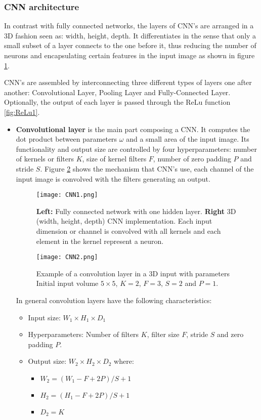 \subsubsection{CNN architecture}
In contrast with fully connected networks, the layers of CNN's are arranged in a 3D fashion seen as: width, height, depth. It differentiates in the sense that only a small subset of a layer connects to the one before it, thus reducing the number of neurons and encapsulating certain features in the input image as shown in  figure \ref{fig:CNNim1}. \

CNN's are assembled by interconnecting three different types of layers one after another: Convolutional Layer, Pooling Layer and Fully-Connected Layer. Optionally, the output of each layer is passed through the ReLu function \ref{fig:ReLu1}. 
\begin{itemize}
\item \textbf{Convolutional layer} is the main part composing a CNN. It computes the dot product between parameters $\omega$ and a small area of the input image. Its  functionality and output size are controlled by four hyperparameters: number of kernels or filters $K$, size of kernel filters $F$, number of zero padding $P$ and stride $S$. Figure \ref{fig:CNNim2} shows the mechanism that  CNN's use, each channel of the input image is convolved with the filters generating an output.  \

\begin{figure}[tb] 
\centering 
\texttt{[image: CNN1.png]} 
\caption[Fully connected network VS CNN]{\textbf{Left:} Fully connected network with one hidden layer. \textbf{Right} 3D (width, height, depth) CNN implementation. Each input dimension or channel is convolved with all kernels and each element in the kernel represent a neuron.}
\label{fig:CNNim1} 
\end{figure}
\begin{figure}[tb] 
\centering 
\texttt{[image: CNN2.png]} 
\caption[Convolution layer]{Example of a convolution layer in a 3D input with parameters Initial input volume $5 \times 5$, $K=2$, $F=3$, $S=2$ and $P=1$.}
\label{fig:CNNim2} 
\end{figure}


In general convolution layers have the following characteristics:
\begin{itemize}
\item Input size: \boldmath$W_1 \times H_1 \times D_1$
\item Hyperparameters: Number of filters \boldmath$K$, filter size \boldmath$F$, stride \boldmath$S$ and zero padding \boldmath$P$.  
\item Output size: \boldmath$W_2 \times H_2 \times D_2$ where:
\begin{itemize} \label{sec:outCNN}
\item \boldmath$W_2 = ( W_1 - F + 2P) / S + 1 $
\item \boldmath$H_2 = ( H_1 - F + 2P) / S + 1 $
\item \boldmath$D_2 = K $
\end{itemize}
\end{itemize}


\end{itemize}
